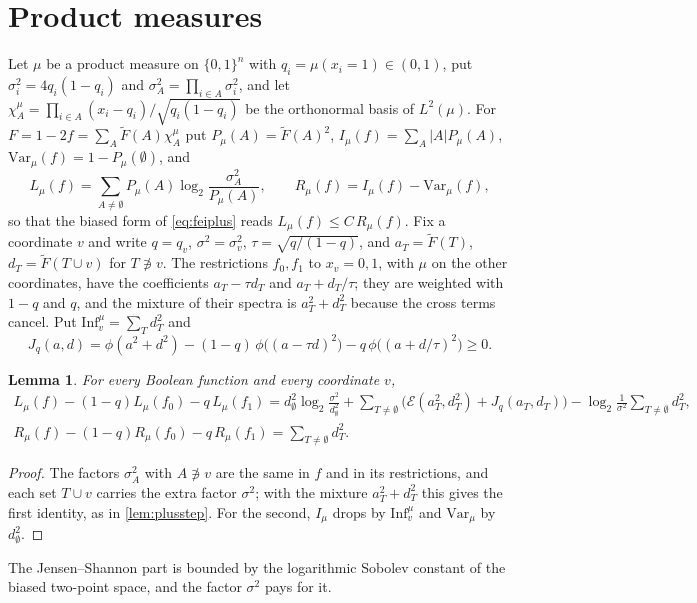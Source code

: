 \documentclass[11pt]{amsart}
\newtheorem{lemma}[theorem]{Lemma}
\theoremstyle{remark}
\newcommand{\Inf}{\mathrm{Inf}}
\newcommand{\Var}{\mathrm{Var}}
\newcommand{\bits}{\{0,1\}}
\begin{document}
\section{Product measures}\label{sec:product}

Let $\mu$ be a product measure on $\bits^n$ with $q_i=\mu(x_i=1)\in(0,1)$, put $\sigma_i^2=4q_i(1-q_i)$ and
$\sigma_A^2=\prod_{i\in A}\sigma_i^2$, and let $\chi^\mu_A=\prod_{i\in A}(x_i-q_i)/\sqrt{q_i(1-q_i)}$ be the orthonormal
basis of $L^2(\mu)$. For $F=1-2f=\sum_A\widetilde F(A)\chi^\mu_A$ put $P_\mu(A)=\widetilde F(A)^2$,
$I_\mu(f)=\sum_A|A|P_\mu(A)$, $\Var_\mu(f)=1-P_\mu(\emptyset)$, and
\[
L_\mu(f)=\sum_{A\neq\emptyset}P_\mu(A)\log_2\frac{\sigma_A^2}{P_\mu(A)},\qquad R_\mu(f)=I_\mu(f)-\Var_\mu(f),
\]
so that the biased form of \eqref{eq:feiplus} reads $L_\mu(f)\le C\,R_\mu(f)$. Fix a coordinate $v$ and write $q=q_v$,
$\sigma^2=\sigma_v^2$, $\tau=\sqrt{q/(1-q)}$, and $a_T=\widetilde F(T)$, $d_T=\widetilde F(T\cup v)$ for $T\not\ni v$. The
restrictions $f_0,f_1$ to $x_v=0,1$, with $\mu$ on the other coordinates, have the coefficients $a_T-\tau d_T$ and
$a_T+d_T/\tau$; they are weighted with $1-q$ and $q$, and the mixture of their spectra is $a_T^2+d_T^2$ because the
cross terms cancel. Put $\Inf^\mu_v=\sum_Td_T^2$ and
\[
J_q(a,d)=\phi(a^2+d^2)-(1-q)\,\phi\bigl((a-\tau d)^2\bigr)-q\,\phi\bigl((a+d/\tau)^2\bigr)\ge0 .
\]

\begin{lemma}\label{lem:biasedstep}
For every Boolean function and every coordinate $v$,
\begin{gather*}
L_\mu(f)-(1-q)L_\mu(f_0)-q\,L_\mu(f_1)=d_\emptyset^2\log_2\frac{\sigma^2}{d_\emptyset^2}
+\sum_{T\neq\emptyset}\bigl(\mathcal E(a_T^2,d_T^2)+J_q(a_T,d_T)\bigr)-\log_2\frac1{\sigma^2}\sum_{T\neq\emptyset}d_T^2,\\
R_\mu(f)-(1-q)R_\mu(f_0)-q\,R_\mu(f_1)=\sum_{T\neq\emptyset}d_T^2 .
\end{gather*}
\end{lemma}

\begin{proof}
The factors $\sigma_A^2$ with $A\not\ni v$ are the same in $f$ and in its restrictions, and each set $T\cup v$ carries the
extra factor $\sigma^2$; with the mixture $a_T^2+d_T^2$ this gives the first identity, as in \cref{lem:plusstep}. For the
second, $I_\mu$ drops by $\Inf^\mu_v$ and $\Var_\mu$ by $d_\emptyset^2$.
\end{proof}

The Jensen--Shannon part is bounded by the logarithmic Sobolev constant of the biased two-point space, and the factor
$\sigma^2$ pays for it.
\end{document}

